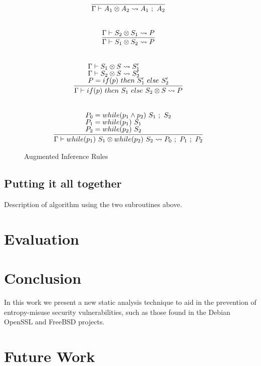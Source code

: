 \documentclass[letterpaper,twocolumn,10pt]{article}
\newcommand{\cross}{\otimes{}}
\begin{document}
\begin{figure}
    \caption{Augmented Inference Rules}
    \label{fig:auginfrules2}
    \[
		\begin{array}{c}
			\infer[]{\Gamma \vdash A_1 \cross A_2 \leadsto A_1\ ;\ A_2}{} \\ \\ \\
			\infer[]{\Gamma \vdash S_1 \cross S_2 \leadsto P}{
				\Gamma \vdash S_2 \cross S_1 \leadsto P
			} \\ \\ \\
			\infer[]{\Gamma \vdash if(p)\ then\ S_1\ else\ S_2 \cross S \leadsto P}{
				\text{$\Gamma \vdash S_1 \cross S \leadsto S_1'$} \\
				\text{$\Gamma \vdash S_2 \cross S \leadsto S_2'$} \\
				\text{$P = if(p)\ then\ S_1'\ else\ S_2'$}
			} \\ \\ \\
			\infer[]{\Gamma \vdash while(p_1)\ S_1 \cross while(p_2)\ S_2 \leadsto P_0\ ;\ P_1\ ;\ P_2}{
				\text{$P_0 = while(p_1 \land p_2)\ S_1\ ;\ S_2$} \\
				\text{$P_1 = while(p_1)\ S_1$} \\
				\text{$P_2 = while(p_2)\ S_2$}
			}
		\end{array}
    \]
\end{figure}

\subsection{Putting it all together}

Description of algorithm using the two subroutines above.

\section{Evaluation}
\label{sec:eval}

\section{Conclusion}

In this work we present a new static analysis technique to aid in the prevention of entropy-misuse security vulnerabilities, such as those
found in the Debian OpenSSL and FreeBSD projects.

\section{Future Work}
\end{document}
